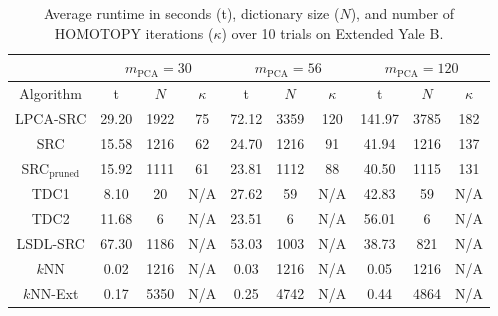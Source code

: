 \documentclass[review]{elsarticle}
\begin{document}
\begin{table}[!htb] 
\small{
\centering
\begin{tabular}{|c|c|c|c|c|c|c|c|c|c|}
\hline
& \multicolumn{3}{|c|}{$m_{\mathrm{PCA}} = 30$} & \multicolumn{3}{|c|}{$m_{\mathrm{PCA}} = 56$} & \multicolumn{3}{|c|}{$m_{\mathrm{PCA}} = 120$} \\
\hline
Algorithm & t & $N$ & $\kappa$ & t & $N$ & $\kappa$ & t & $N$ & $\kappa$ \\
\hline
LPCA-SRC	& 29.20	& 1922	& 75	& 72.12	& 3359	& 120	& 141.97	& 3785	& 182 \\
SRC	& 15.58	& 1216	& 62	& 24.70	& 1216	& 91	& 41.94	& 1216	& 137 \\
SRC$_\mathrm{pruned}$ & 15.92	& 1111	& 61	& 23.81	& 1112	& 88	& 40.50	& 1115	& 131 \\
TDC1 &	8.10	&	20	&	N/A	&	27.62	&	59	&	N/A	&	42.83	&	59	&	N/A	\\
TDC2 &	11.68	&	6	&	N/A	&	23.51	&	6	&	N/A	&	56.01	&	6	&	N/A	\\
LSDL-SRC	& 67.30	& 1186	& N/A	& 53.03	& 1003	& N/A	& 38.73	& 821	& N/A \\
$k$NN &	0.02	& 1216 & N/A &	0.03	& 1216 & N/A &	0.05	& 1216 & N/A \\
$k$NN-Ext &	0.17	& 5350 & N/A &	0.25	& 4742 & N/A &	0.44	& 4864 & N/A \\	
\hline
\end{tabular}
\caption{Average runtime in seconds (t), dictionary size ($N$), and number of HOMOTOPY iterations ($\kappa$) over 10 trials on Extended Yale B.} 
\label{Ext_Yale_B_time}}
\end{table}
\end{document}
